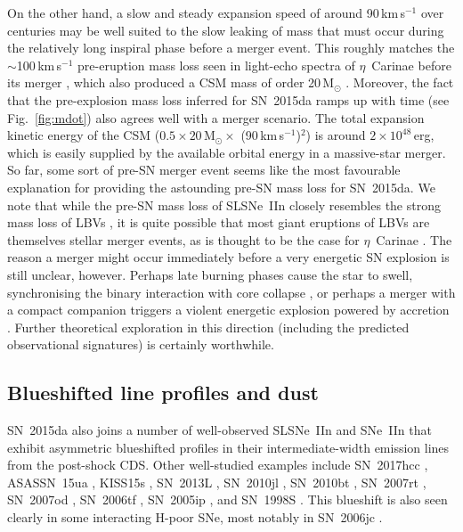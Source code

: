 \documentclass[fleqn,usenatbib,useAMS]{mnras}
\begin{document}
On the other hand, a slow and steady expansion speed of around 90\,km\,s$^{-1}$ over centuries may be well suited to the slow leaking of mass
that must occur during the relatively long inspiral phase before a
merger event.  This roughly matches the $\sim$100\,km\,s$^{-1}$
pre-eruption mass loss seen in light-echo spectra of $\eta$~Carinae
before its merger \citep{smith18}, which also produced a CSM mass of order 20\,M$_{\odot}$ \citep{smith03mass}. Moreover, the fact that the
pre-explosion mass loss inferred for SN~2015da ramps up with time (see
Fig.~\ref{fig:mdot}) also agrees well with a merger scenario.  The
total expansion kinetic energy of the CSM ($0.5 \times 20$\,M$_{\odot} \times$ (90\,km\,s$^{-1}$)$^2$) is around $2 \times 10^{48}$\,erg, which
is easily supplied by the available orbital energy in a massive-star
merger.  So far, some sort of pre-SN merger event \citep{sa14} seems
like the most favourable explanation for providing the astounding
pre-SN mass loss for SN~2015da.  We note that while the pre-SN mass
loss of SLSNe~IIn closely resembles the strong mass loss of LBVs
\citep{smith07}, it is quite possible that most giant eruptions of
LBVs are themselves stellar merger events, as is thought to be the
case for $\eta$~Carinae \citep{smith18}.  The reason a
merger might occur immediately before a very energetic SN explosion is
still unclear, however.  Perhaps late burning phases cause the star to
swell, synchronising the binary interaction with core collapse
\citep{sa14}, or perhaps a merger with a compact companion triggers a
violent energetic explosion powered by accretion
\citep{fw98,schroder20,sa14}.  Further theoretical exploration in this
direction (including the predicted observational signatures) is
certainly worthwhile.


\subsection{Blueshifted line profiles and dust}

SN~2015da also joins a number of well-observed SLSNe~IIn and SNe~IIn
that exhibit asymmetric blueshifted profiles in their
intermediate-width emission lines from the post-shock CDS.
Other well-studied examples include SN~2017hcc \citep{smith20},
ASASSN~15ua \citep{dickinson23}, KISS15s \citep{kokubo19}, SN~2013L \citep{andrews17}, SN~2010jl
\citep{smith12,gall14}, SN~2010bt \citep{eliasrosa18}, SN~2007rt
\citep{trundle09}, SN~2007od \citep{andrews10}, SN~2006tf
\citep{smith08tf}, SN~2005ip
\citep{smith09sn05ip,fox10,smith17sn05ip}, and SN~1998S
\citep{ms12,pozzo04}. This blueshift is also seen clearly in some
interacting H-poor SNe, most notably in SN~2006jc \citep{smith08jc}.
\end{document}
